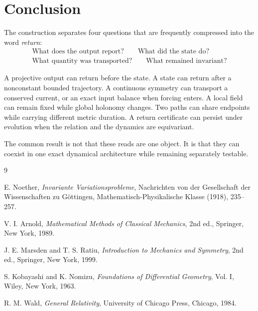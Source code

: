 \documentclass[11pt,letterpaper]{article}
\theoremstyle{dynamicsstyle}
\begin{document}
\section{Conclusion}

The construction separates four questions that are frequently compressed into the word \emph{return}:
\[
\boxed{
\begin{gathered}
\text{What does the output report?}\qquad
\text{What did the state do?}\\
\text{What quantity was transported?}\qquad
\text{What remained invariant?}
\end{gathered}}
\]

A projective output can return before the state.  A state can return after a nonconstant bounded trajectory.  A continuous symmetry can transport a conserved current, or an exact input balance when forcing enters.  A local field can remain fixed while global holonomy changes.  Two paths can share endpoints while carrying different metric duration.  A return certificate can persist under evolution when the relation and the dynamics are equivariant.

The common result is not that these reads are one object.  It is that they can coexist in one exact dynamical architecture while remaining separately testable.

\begin{thebibliography}{9}

E. Noether,
\emph{Invariante Variationsprobleme},
Nachrichten von der Gesellschaft der Wissenschaften zu G\"ottingen, Mathematisch-Physikalische Klasse (1918), 235--257.

V. I. Arnold,
\emph{Mathematical Methods of Classical Mechanics},
2nd ed., Springer, New York, 1989.

J. E. Marsden and T. S. Ratiu,
\emph{Introduction to Mechanics and Symmetry},
2nd ed., Springer, New York, 1999.

S. Kobayashi and K. Nomizu,
\emph{Foundations of Differential Geometry}, Vol. I,
Wiley, New York, 1963.

R. M. Wald,
\emph{General Relativity},
University of Chicago Press, Chicago, 1984.

\end{thebibliography}
\end{document}
